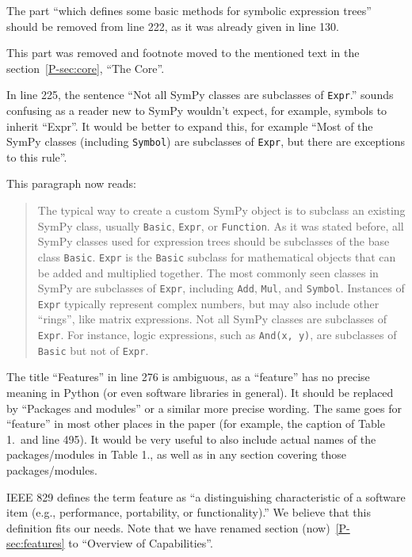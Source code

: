 \documentclass[answers,12pt]{exam}
\begin{document}
\begin{questions}
\question The part ``which defines some basic methods for symbolic expression trees'' should be removed from line 222, as it was already given in line 130.
\begin{solution}
This part was removed and footnote moved to the mentioned
text in the section~\ref{P-sec:core}, ``The Core''.
\end{solution}

\question In line 225, the sentence ``Not all SymPy classes are subclasses of \texttt{Expr}.'' sounds confusing as a reader new to SymPy wouldn't expect, for example, symbols to inherit ``Expr''. It would be better to expand this, for example ``Most of the SymPy classes (including \texttt{Symbol}) are subclasses of \texttt{Expr}, but there are exceptions to this rule''.
\begin{solution}
This paragraph now reads:
\begin{quote}
  The typical way to create a custom SymPy object is to subclass an existing
  SymPy class, usually \texttt{Basic}, \texttt{Expr}, or \texttt{Function}. As
  it was stated before, all SymPy classes used for expression trees should be
  subclasses of the base class \texttt{Basic}. \texttt{Expr} is the
  \texttt{Basic} subclass for mathematical objects that can be added and
  multiplied together. The most commonly seen classes in SymPy are subclasses
  of \texttt{Expr}, including \texttt{Add}, \texttt{Mul}, and \texttt{Symbol}.
  Instances of \texttt{Expr} typically represent complex numbers, but may also
  include other ``rings'', like matrix expressions. Not all SymPy classes are
  subclasses of \texttt{Expr}. For instance, logic expressions, such as
  \verb|And(x, y)|, are subclasses of \texttt{Basic} but not of \texttt{Expr}.
\end{quote}
\end{solution}

\question The title ``Features'' in line 276 is ambiguous, as a ``feature''
has no precise meaning in Python (or even software libraries in general). It
should be replaced by ``Packages and modules'' or a similar more precise
wording. The same goes for ``feature'' in most other places in the paper (for
example, the caption of Table 1.\ and line 495). It would be very useful to also include actual names of the packages/modules in Table 1., as well as in any section covering those packages/modules.
\begin{solution}
IEEE 829 defines the term feature as ``a distinguishing
characteristic of a software item (e.g., performance, portability,
or functionality).''  We believe that this definition fits our needs. Note
that we have renamed section (now)~\ref{P-sec:features} to ``Overview of Capabilities''.


\end{solution}
\end{questions}
\end{document}
